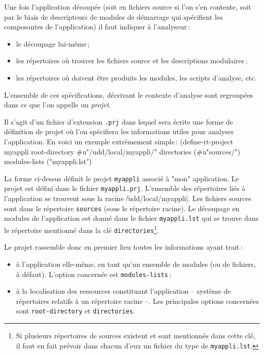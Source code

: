 


Une fois l'application d\'{e}coup\'{e}e (soit en fichiers source si l'on
s'en contente, soit par le biais de descripteurs de modules
de d\'{e}marrage qui sp\'{e}cifient les composantes de l'application)
il faut indiquer \`{a} l'analyseur\,:
\begin{itemize}
\item le d\'{e}coupage lui-m\^{e}me\,;
\item les r\'{e}pertoires o\`{u} trouver les fichiers source et les
descriptions modulaires\,;
\item  les r\'{e}pertoires o\`{u} doivent \^{e}tre produits
les modules, les scripts d'analyse, etc.
\end{itemize}

L'ensemble de ces sp\'{e}cifications, d\'{e}crivant le contexte
d'analyse sont regroup\'{e}es dans ce que l'on appelle
un {\em projet}.

Il s'agit d'un fichier d'extension {\tt .prj} dans lequel sera
\'{e}crite une forme de d\'{e}finition de projet o\`{u} l'on sp\'{e}cifiera
les informations utiles pour analyser l'application.
En voici un exemple extr\^{e}mement simple\,:
\BeginLL
(define-rt-project myappli
   root-directory #u"/udd/local/myappli/" 
   directories (#u"sources/")
   modules-lists ("myappli.lst") 
\EndLL

La forme ci-dessus d\'{e}finit le projet {\tt myappli}
associ\'{e} \`{a} "mon" application. Le projet est d\'{e}fini dans
le fichier {\tt myappli.prj}.
L'ensemble des r\'{e}pertoires li\'{e}s \`{a} l'application
se trouvent sous la racine \|/udd/local/myappli|. Les fichiers
sources sont dans le r\'{e}pertoire {\tt sources} (sous le r\'{e}pertoire
racine). 
Le d\'{e}coupage en modules de l'application est donn\'{e} dans le fichier
{\tt myappli.lst} qui se trouve dans le r\'{e}pertoire mentionn\'{e} dans la
cl\'{e} {\tt directories}\footnote{Si plusieurs r\'{e}pertoires de sources
existent et sont mentionn\'{e}s dans cette cl\'{e}, il faut en fait
pr\'{e}voir dans chacun d'eux un fichier du type de {\tt myappli.lst}.}.

Le projet rassemble donc en premier lieu
toutes les informations ayant trait\,:
\begin{itemize}
\item \`{a} l'application elle-m\^{e}me, en tant qu'un ensemble
de modules (ou de fichiers, \`{a} d\'{e}faut). L'option concern\'{e}e
est {\tt modules-lists}\,;
\item \`{a} la localisation des ressources constituant l'application
-- syst\`{e}me de r\'{e}pertoires relatifs \`{a} un r\'{e}pertoire racine --.
Les principales options concern\'{e}es sont {\tt root-directory}
et {\tt directories}.
\end{itemize}

